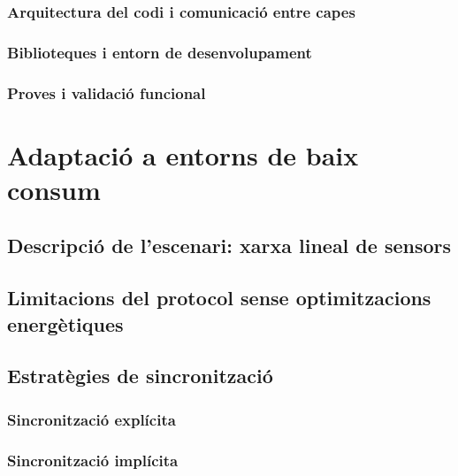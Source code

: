 \documentclass{tfgitic}[2024/07/01]
\begin{document}
\subsection{Arquitectura del codi i comunicació entre capes}
\subsection{Biblioteques i entorn de desenvolupament}
\subsection{Proves i validació funcional}

\chapter{Adaptació a entorns de baix consum}
\section{Descripció de l’escenari: xarxa lineal de sensors}
\section{Limitacions del protocol sense optimitzacions energètiques}
\section{Estratègies de sincronització}
\subsection{Sincronització explícita}
\subsection{Sincronització implícita}
\end{document}
